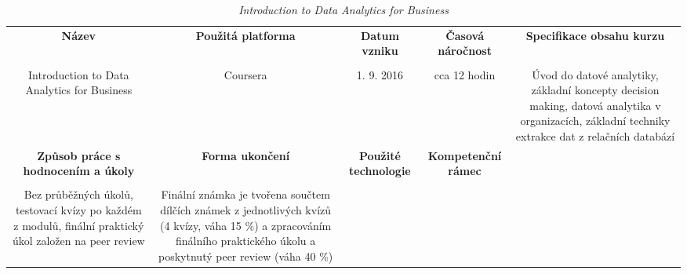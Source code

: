 \begin{landscape}

\begin{table}[htbp]

\renewcommand\thetable{1}

\caption{\textit{Introduction to Data Analytics for Business}}\label{tab1}

\footnotesize

{

\justifying

\begin{tabularx}{\linewidth}{CCCCC}

\toprule

\textbf{Název} &

\textbf{Použitá platforma} &

\textbf{Datum vzniku} &

\textbf{Časová náročnost} &
 
\textbf{Specifikace obsahu kurzu}

\\

\tabularnewline
\midrule

Introduction to Data Analytics for Business

&

Coursera

&

1. 9. 2016

&

cca 12 hodin

&

Úvod do datové analytiky, základní koncepty decision making, datová analytika v organizacích, základní techniky extrakce dat z relačních databází

\\
\toprule

\textbf{Způsob práce s hodnocením a úkoly} &

\textbf{Forma ukončení} &

\textbf{Použité technologie} &

\textbf{Kompetenční rámec} 

\\

\tabularnewline
\midrule

Bez průběžných úkolů, testovací kvízy po každém z modulů, finální praktický úkol založen na peer review

&

Finální známka je tvořena součtem dílčích známek z jednotlivých kvízů (4 kvízy, váha 15 \%) a zpracováním finálního praktického úkolu a poskytnutý peer review (váha 40 \%)


\end{tabularx}}
\end{table}
\end{landscape}
